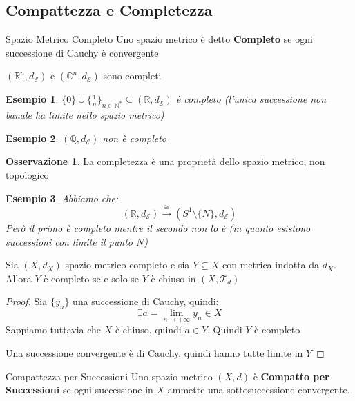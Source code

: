 \documentclass[11pt,a4paper,twoside]{article}
\newtheorem{es}{Esempio}
\theoremstyle{definition}
\newtheorem*{oss}{Osservazione}
\begin{document}
\subsection{Compattezza e Completezza}

\begin{defn}{Spazio Metrico Completo}{}
	Uno spazio metrico è detto \textbf{Completo} se ogni successione di Cauchy è convergente
\end{defn}

\begin{thm}{}{}
	$(\mathbb R^n, d_\mathcal E)$ e $(\mathbb C^n, d_\mathcal E)$ sono completi
\end{thm}

\begin{es}
	$\{0\}\cup \{\frac 1n\}_{n \in \mathbb N^*} \subseteq (\mathbb R, d_\mathcal E)$ è completo (l'unica successione non banale ha limite nello spazio metrico)
\end{es}

\begin{es}
	$(\mathbb Q, d_\mathcal E)$ non è completo
\end{es}

\begin{oss}
	La completezza è una proprietà dello spazio metrico, \underline{non} topologico
\end{oss}

\begin{es}
	Abbiamo che:
	\[ (\mathbb R, d_\mathcal E) \xrightarrow{\cong} (S^1\setminus\{N\}, d_\mathcal E) \]
	Però il primo è completo mentre il secondo non lo è (in quanto esistono successioni con limite il punto $N$)
\end{es}

\begin{prop}{}{}
	Sia $(X, d_X)$ spazio metrico completo e sia $Y\subseteq X$ con metrica indotta da $d_X$. Allora $Y$ è completo se e solo se $Y$ è chiuso in $(X, \mathcal T_d)$
\end{prop}
\begin{proof}
	\fbox{$\Leftarrow$} Sia $\{y_n\}$ una successione di Cauchy, quindi:
	\[ \exists a = \lim_{n \to +\infty} y_n \in X \]
	Sappiamo tuttavia che $X$ è chiuso, quindi $a \in Y$. Quindi $Y$ è completo

	\fbox{$\Rightarrow$} Una successione convergente è di Cauchy, quindi hanno tutte limite in $Y$
\end{proof}

\begin{defn}{Compattezza per Successioni}{}
	Uno spazio metrico $(X,d)$ è \textbf{Compatto per Successioni} se ogni successione in $X$ ammette una sottosuccessione convergente.
\end{defn}
\end{document}
